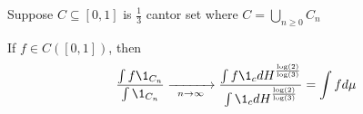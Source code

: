 \begin{exercise}
	Suppose $C \subseteq  [0,1]$ is $\frac{1}{3}$ cantor set where $C = \bigcup_{n \geq 0} C_{n}$

	If $f \in C([0,1])$, then
	\begin{align*}
		\frac{\int f \1_{C_n}}{\int \1_{C_n}}  \xrightarrow[\enskip n \to \infty\enskip]{} 
		\frac{\int f \1_{c} d H^{\frac{\log(2)}{\log(3)}}}{\int \1_{c} d H^{\frac{\log(2)}{\log(3)}}}
	= \int f d\mu
	\end{align*} 
\end{exercise}


